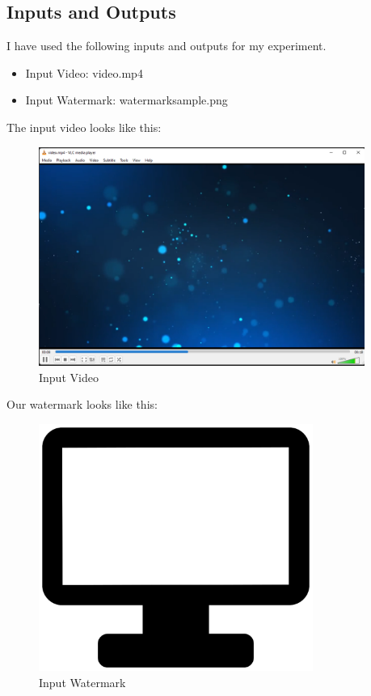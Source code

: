 \documentclass[ebook,12pt,oneside,openany]{memoir}
\begin{document}
\subsection{Inputs and Outputs}

I have used the following inputs and outputs for my experiment.

\begin{itemize}
\item Input Video: video.mp4
\item Input Watermark: watermarksample.png
\end{itemize}

The input video looks like this:

\begin{figure}[h!]
\centering
\includegraphics[width=0.95\textwidth]{images/image.png}
\caption{Input Video}
\end{figure}

Our watermark looks like this:

\begin{figure}[h!]
\centering
\includegraphics[width=0.8\textwidth]{images/watermarksample.png}
\caption{Input Watermark}
\end{figure}
\end{document}
